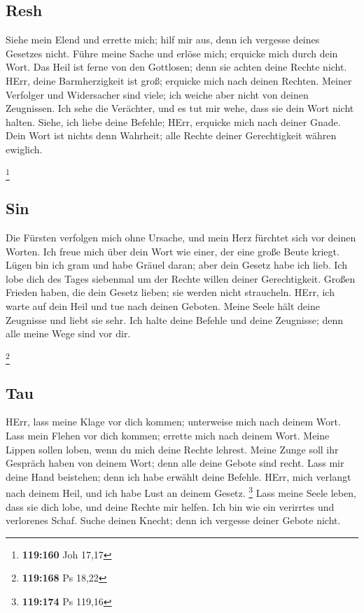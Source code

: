 \hypertarget{resh}{%
\subsection{Resh}\label{resh}}

 Siehe mein Elend und errette mich; hilf mir aus, denn
ich vergesse deines Gesetzes nicht.  Führe meine Sache
und erlöse mich; erquicke mich durch dein Wort.  Das
Heil ist ferne von den Gottlosen; denn sie achten deine Rechte nicht.
 HErr, deine Barmherzigkeit ist groß; erquicke mich nach
deinen Rechten.  Meiner Verfolger und Widersacher sind
viele; ich weiche aber nicht von deinen Zeugnissen.  Ich
sehe die Verächter, und es tut mir wehe, dass sie dein Wort nicht
halten.  Siehe, ich liebe deine Befehle; HErr, erquicke
mich nach deiner Gnade.  Dein Wort ist nichts denn
Wahrheit; alle Rechte deiner Gerechtigkeit währen ewiglich.

\footnote{\textbf{119:160} Joh 17,17}

\hypertarget{sin}{%
\subsection{Sin}\label{sin}}

 Die Fürsten verfolgen mich ohne Ursache, und mein Herz
fürchtet sich vor deinen Worten.  Ich freue mich über
dein Wort wie einer, der eine große Beute kriegt.  Lügen
bin ich gram und habe Gräuel daran; aber dein Gesetz habe ich lieb.
 Ich lobe dich des Tages siebenmal um der Rechte willen
deiner Gerechtigkeit.  Großen Frieden haben, die dein
Gesetz lieben; sie werden nicht straucheln.  HErr, ich
warte auf dein Heil und tue nach deinen Geboten.  Meine
Seele hält deine Zeugnisse und liebt sie sehr.  Ich
halte deine Befehle und deine Zeugnisse; denn alle meine Wege sind vor
dir.

\footnote{\textbf{119:168} Ps 18,22}

\hypertarget{tau}{%
\subsection{Tau}\label{tau}}

 HErr, lass meine Klage vor dich kommen; unterweise mich
nach deinem Wort.  Lass mein Flehen vor dich kommen;
errette mich nach deinem Wort.  Meine Lippen sollen
loben, wenn du mich deine Rechte lehrest.  Meine Zunge
soll ihr Gespräch haben von deinem Wort; denn alle deine Gebote sind
recht.  Lass mir deine Hand beistehen; denn ich habe
erwählt deine Befehle.  HErr, mich verlangt nach deinem
Heil, und ich habe Lust an deinem Gesetz. \footnote{\textbf{119:174} Ps
  119,16}  Lass meine Seele leben, dass sie dich lobe,
und deine Rechte mir helfen.  Ich bin wie ein verirrtes
und verlorenes Schaf. Suche deinen Knecht; denn ich vergesse deiner
Gebote nicht.

